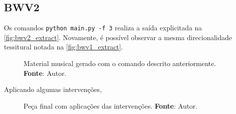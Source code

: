 \subsection{BWV2}

Os comandos \verb|python main.py -f 3| realiza a saída explicitada na \autoref{fig:bwv2_extract}. Novamente, é possível observar a mesma direcionalidade tessitural notada na \autoref{fig:bwv1_extract}.

\begin{figure}[h]
  \centering
  
  \caption{Material musical gerado com o comando descrito anteriormente. \textbf{Fonte}: Autor.}
  \label{fig:bwv2_extract}
\end{figure}


Aplicando algumas intervenções,

\begin{figure}[!hb]
  \centering

\caption{Peça final com aplicações das intervenções. \textbf{Fonte}: Autor.}
\label{fig:bwv2}
\end{figure}

